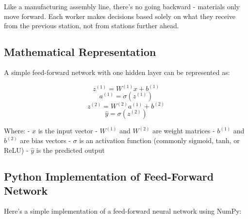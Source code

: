 \documentclass[
  letterpaper,
  DIV=11,
  numbers=noendperiod]{scrreprt}
\begin{document}
Like a manufacturing assembly line, there's no going backward -
materials only move forward. Each worker makes decisions based solely on
what they receive from the previous station, not from stations further
ahead.

\subsection{Mathematical
Representation}\label{mathematical-representation}

A simple feed-forward network with one hidden layer can be represented
as:

\[z^{(1)} = W^{(1)}x + b^{(1)}\] \[a^{(1)} = \sigma(z^{(1)})\]
\[z^{(2)} = W^{(2)}a^{(1)} + b^{(2)}\] \[\hat{y} = \sigma(z^{(2)})\]

Where: - \(x\) is the input vector - \(W^{(1)}\) and \(W^{(2)}\) are
weight matrices - \(b^{(1)}\) and \(b^{(2)}\) are bias vectors -
\(\sigma\) is an activation function (commonly sigmoid, tanh, or ReLU) -
\(\hat{y}\) is the predicted output

\subsection{Python Implementation of Feed-Forward
Network}\label{python-implementation-of-feed-forward-network}

Here's a simple implementation of a feed-forward neural network using
NumPy:
\end{document}
